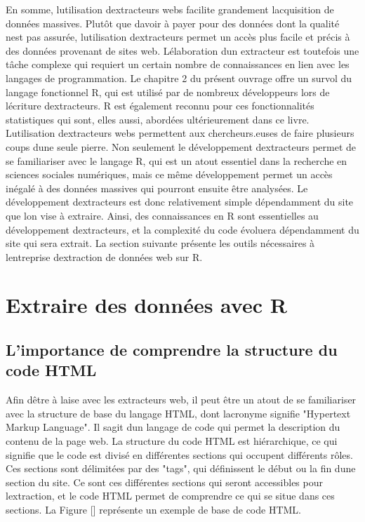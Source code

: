 \documentclass[
  letterpaper,
  DIV=11,
  numbers=noendperiod]{scrreprt}
\begin{document}
En somme, l\textquotesingle utilisation d\textquotesingle extracteurs
webs facilite grandement l\textquotesingle acquisition de données
massives. Plutôt que d\textquotesingle avoir à payer pour des données
dont la qualité n\textquotesingle est pas assurée,
l\textquotesingle utilisation d\textquotesingle extracteurs permet un
accès plus facile et précis à des données provenant de sites web.
L\textquotesingle élaboration d\textquotesingle un extracteur est
toutefois une tâche complexe qui requiert un certain nombre de
connaissances en lien avec les langages de programmation. Le chapitre 2
du présent ouvrage offre un survol du langage fonctionnel R, qui est
utilisé par de nombreux développeurs lors de l\textquotesingle écriture
d\textquotesingle extracteurs. R est également reconnu pour ces
fonctionnalités statistiques qui sont, elles aussi, abordées
ultérieurement dans ce livre. L\textquotesingle utilisation
d\textquotesingle extracteurs webs permettent aux chercheurs.euses de
faire plusieurs coups d\textquotesingle une seule pierre. Non seulement
le développement d\textquotesingle extracteurs permet de se familiariser
avec le langage R, qui est un atout essentiel dans la recherche en
sciences sociales numériques, mais ce même développement permet un accès
inégalé à des données massives qui pourront ensuite être analysées. Le
développement d\textquotesingle extracteurs est donc relativement simple
dépendamment du site que l\textquotesingle on vise à extraire. Ainsi,
des connaissances en R sont essentielles au développement
d\textquotesingle extracteurs, et la complexité du code évoluera
dépendamment du site qui sera extrait. La section suivante présente les
outils nécessaires à l\textquotesingle entreprise
d\textquotesingle extraction de données web sur R.

\section{Extraire des données avec
R}\label{extraire-des-donnuxe9es-avec-r}

\subsection{L'importance de comprendre la structure du code
HTML}\label{limportance-de-comprendre-la-structure-du-code-html}

Afin d\textquotesingle être à l\textquotesingle aise avec les
extracteurs web, il peut être un atout de se familiariser avec la
structure de base du langage HTML, dont l\textquotesingle acronyme
signifie "Hypertext Markup Language". Il s\textquotesingle agit
d\textquotesingle un langage de code qui permet la description du
contenu de la page web. La structure du code HTML est hiérarchique, ce
qui signifie que le code est divisé en différentes sections qui occupent
différents rôles. Ces sections sont délimitées par des "tags", qui
définissent le début ou la fin d\textquotesingle une section du site. Ce
sont ces différentes sections qui seront accessibles pour
l\textquotesingle extraction, et le code HTML permet de comprendre ce
qui se situe dans ces sections. La Figure {[}{]} représente un exemple
de base de code HTML.~
\end{document}
